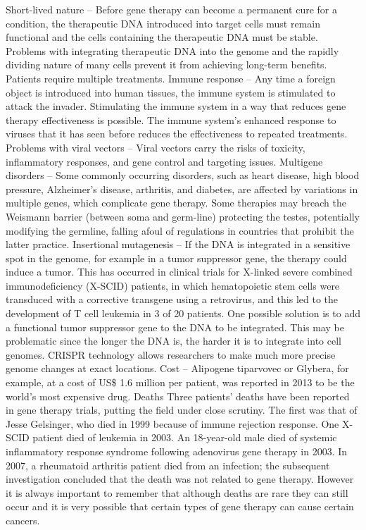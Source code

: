 Short-lived nature -- Before gene therapy can become a permanent cure for a condition, the therapeutic DNA introduced into target cells must remain functional and the cells containing the therapeutic DNA must be stable. Problems with integrating therapeutic DNA into the genome and the rapidly dividing nature of many cells prevent it from achieving long-term benefits. Patients require multiple treatments.
Immune response -- Any time a foreign object is introduced into human tissues, the immune system is stimulated to attack the invader. Stimulating the immune system in a way that reduces gene therapy effectiveness is possible. The immune system's enhanced response to viruses that it has seen before reduces the effectiveness to repeated treatments.
Problems with viral vectors -- Viral vectors carry the risks of toxicity, inflammatory responses, and gene control and targeting issues.
Multigene disorders -- Some commonly occurring disorders, such as heart disease, high blood pressure, Alzheimer's disease, arthritis, and diabetes, are affected by variations in multiple genes, which complicate gene therapy.
Some therapies may breach the Weismann barrier (between soma and germ-line) protecting the testes, potentially modifying the germline, falling afoul of regulations in countries that prohibit the latter practice.
Insertional mutagenesis -- If the DNA is integrated in a sensitive spot in the genome, for example in a tumor suppressor gene, the therapy could induce a tumor. This has occurred in clinical trials for X-linked severe combined immunodeficiency (X-SCID) patients, in which hematopoietic stem cells were transduced with a corrective transgene using a retrovirus, and this led to the development of T cell leukemia in 3 of 20 patients. One possible solution is to add a functional tumor suppressor gene to the DNA to be integrated. This may be problematic since the longer the DNA is, the harder it is to integrate into cell genomes. CRISPR technology allows researchers to make much more precise genome changes at exact locations.
Cost -- Alipogene tiparvovec or Glybera, for example, at a cost of US\$ 1.6 million per patient, was reported in 2013 to be the world's most expensive drug.
Deaths
Three patients' deaths have been reported in gene therapy trials, putting the field under close scrutiny. The first was that of Jesse Gelsinger, who died in 1999 because of immune rejection response. One X-SCID patient died of leukemia in 2003. An 18-year-old male died of systemic inflammatory response syndrome following adenovirus gene therapy in 2003. In 2007, a rheumatoid arthritis patient died from an infection; the subsequent investigation concluded that the death was not related to gene therapy. However it is always important to remember that although deaths are rare they can still occur and it is very possible that certain types of gene therapy can cause certain cancers.

